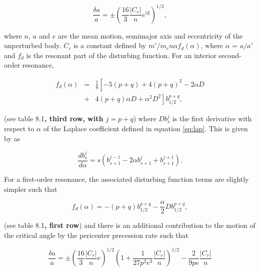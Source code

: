 \documentclass[fleqn,usenatbib]{mnras}
\begin{document}
\begin{equation}\label{eq:res_so}
	\frac{\delta a}{a} = \pm \left( \frac{16}{3} \frac{\left| C_{r} \right|}{n} e^{\left| q \right|} \right)^{1/2},
\end{equation}

\noindent where $n$, $a$ and $e$ are the mean motion, semimajor axis and eccentricity of the unperturbed body. $C_{r}$ is a constant defined by 
$m'/m_{c} n \alpha f_{d}(\alpha)$, where $\alpha$ = $a/a'$ and $f_{d}$ is the resonant part of the disturbing function. For an interior second-order 
resonance,

\begin{eqnarray}\label{eq:fd_so}
	f_{d} (\alpha) &=& \frac{1}{8} \left[ -5(p+q) + 4(p+q)^{2} - 2 \alpha D \right. \\ \nonumber
	                      & + & \left. 4(p+q) \alpha D + \alpha^{2} D^{2} \right] b^{p+q}_{1/2},
\end{eqnarray}

\noindent (see \citet{1999ssd..book.....M} table 8.1\textbf{, third row, with $j = p + q$}) where $D b^{j}_{s}$ is the first derivative with respect to $\alpha$ of the Laplace coefficient defined in equation \ref{eq:lap}. This is given by \citet{1961mcm..book.....B} as

\begin{equation}\label{eq:lap_d}
	\frac{d b_{s}^{j}}{d \alpha} = s \left( b_{s+1}^{j-1} - 2 \alpha b_{s+1}^{j} + b_{s+1}^{j+1} \right).
\end{equation}

For a first-order resonance, the associated disturbing function terms are slightly simpler such that

\begin{equation}\label{eq:fd_fo}
	f_{d}(\alpha) = -(p+q) b_{1/2}^{p+q} - \frac{\alpha}{2} D b_{1/2}^{p+q},
\end{equation}

\noindent (see \citet{1999ssd..book.....M} table 8.1\textbf{, first row}) and there is an additional contribution to the motion of the critical angle by the pericenter precession rate such that

\begin{equation}\label{eq:res_fo}
	\frac{\delta a}{a} = \pm \left(\frac{16}{3} \frac{\left| C_{r} \right|}{n} e \right)^{1/2} \left(  1 + \frac{1}{27 p^2 e^3} \frac{\left| C_{r} \right|}{n} 
	\right)^{1/2} - \frac{2}{9 p e}  \frac{\left| C_{r} \right|}{n}
\end{equation}
\end{document}
